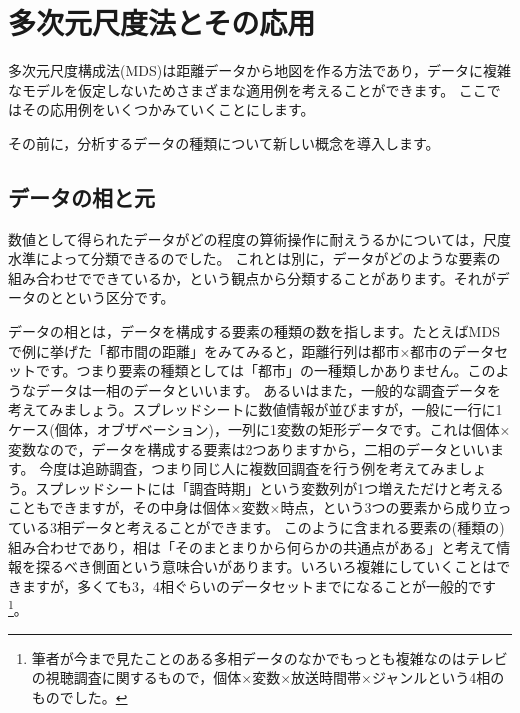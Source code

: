 \documentclass{ltjsbook}
\begin{document}
\chapter{多次元尺度法とその応用}
\label{H08_MDS}
多次元尺度構成法(MDS)は距離データから地図を作る方法であり，データに複雑なモデルを仮定しないためさまざまな適用例を考えることができます。
ここではその応用例をいくつかみていくことにします。

その前に，分析するデータの種類について新しい概念を導入します。

\section{データの相と元}
\label{ModeAndWay}
数値として得られたデータがどの程度の算術操作に耐えうるかについては，尺度水準によって分類できるのでした。
これとは別に，データがどのような要素の組み合わせでできているか，という観点から分類することがあります。それがデータのとという区分です。

データの相とは，データを構成する要素の種類の数を指します。たとえばMDSで例に挙げた「都市間の距離」をみてみると，距離行列は都市$\times$都市のデータセットです。つまり要素の種類としては「都市」の一種類しかありません。このようなデータは一相のデータといいます。
あるいはまた，一般的な調査データを考えてみましょう。スプレッドシートに数値情報が並びますが，一般に一行に1ケース(個体，オブザベーション)，一列に1変数の矩形データです。これは個体$\times$変数なので，データを構成する要素は2つありますから，二相のデータといいます。
今度は追跡調査，つまり同じ人に複数回調査を行う例を考えてみましょう。スプレッドシートには「調査時期」という変数列が1つ増えただけと考えることもできますが，その中身は個体$\times$変数$\times$時点，という3つの要素から成り立っている3相データと考えることができます。
このように含まれる要素の(種類の)組み合わせであり，相は「そのまとまりから何らかの共通点がある」と考えて情報を探るべき側面という意味合いがあります。いろいろ複雑にしていくことはできますが，多くても3，4相ぐらいのデータセットまでになることが一般的です\footnote{筆者が今まで見たことのある多相データのなかでもっとも複雑なのはテレビの視聴調査に関するもので，個体$\times$変数$\times$放送時間帯$\times$ジャンルという4相のものでした。}。
\end{document}
